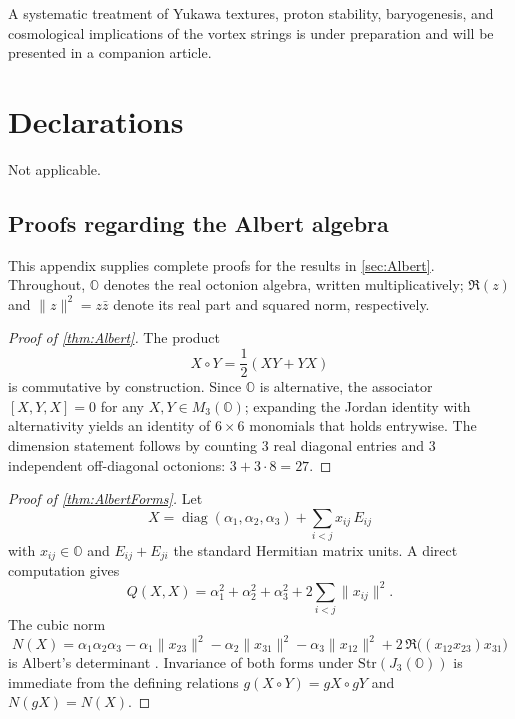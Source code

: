 \documentclass[pdflatex,sn-mathphys-num]{sn-jnl}
\theoremstyle{thmstyleone}
\theoremstyle{thmstyletwo}%
\theoremstyle{thmstylethree}%
\begin{document}
A systematic treatment of Yukawa textures, proton stability,
baryogenesis, and cosmological implications of the vortex strings is
under preparation and will be presented in a companion article.

\section*{Declarations}

Not applicable.

\begin{appendices}


\appendix

\section{Proofs regarding the Albert algebra}
\label{app:Albert}

This appendix supplies complete proofs for the results in \autoref{sec:Albert}.
Throughout, $\mathbb{O}$ denotes the real octonion algebra, written
multiplicatively; $\Re(z)$ and $\|z\|^{2}=z\bar z$ denote its real part and
squared norm, respectively.

\begin{proof}[Proof of \autoref{thm:Albert}]
The product
\[X\circ Y=\frac12(XY+YX)\]
is commutative by construction. Since $\mathbb{O}$ is alternative, the
associator \([X,Y,X]=0\) for any \(X,Y\in M_{3}(\mathbb{O})\); expanding
the Jordan identity with alternativity yields an identity of
$6\times6$ monomials that holds entrywise.  The dimension statement
follows by counting $3$ real diagonal entries and $3$ independent
off-diagonal octonions: \(3+3\cdot8=27\).
\end{proof}

\begin{proof}[Proof of \autoref{thm:AlbertForms}]
Let
\[X=\operatorname{diag}(\alpha_{1},\alpha_{2},\alpha_{3})+\sum_{i<j}x_{ij}\,E_{ij}\]
with $x_{ij}\in\mathbb{O}$ and $E_{ij}+E_{ji}$ the standard Hermitian matrix
units.  A direct computation gives
\[
  Q(X,X)=\alpha_{1}^{2}+\alpha_{2}^{2}+\alpha_{3}^{2}
          +2\sum_{i<j}\|x_{ij}\|^{2}.
\]
The cubic norm
\[
  N(X)=\alpha_{1}\alpha_{2}\alpha_{3}
        -\alpha_{1}\|x_{23}\|^{2}
        -\alpha_{2}\|x_{31}\|^{2}
        -\alpha_{3}\|x_{12}\|^{2}
        +2\,\Re\bigl((x_{12}x_{23})x_{31}\bigr)
\]
is Albert’s determinant \cite{Albert:1934}.  Invariance of both
forms under $\mathrm{Str}(J_{3}(\mathbb{O}))$ is immediate from the
defining relations $g(X\circ Y)=gX\circ gY$ and $N(gX)=N(X)$.
\end{proof}


\end{appendices}
\end{document}
